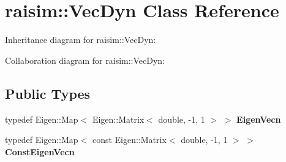 \hypertarget{classraisim_1_1VecDyn}{}\section{raisim\+:\+:Vec\+Dyn Class Reference}
\label{classraisim_1_1VecDyn}


Inheritance diagram for raisim\+:\+:Vec\+Dyn\+:


Collaboration diagram for raisim\+:\+:Vec\+Dyn\+:
\subsection*{Public Types}
\begin{DoxyCompactItemize}
\item 
\mbox{\label{classraisim_1_1VecDyn_a577d6acb0f1f3518b6cf4423c8d1a961}} 
typedef Eigen\+::\+Map$<$ Eigen\+::\+Matrix$<$ double, -\/1, 1 $>$ $>$ {\bfseries Eigen\+Vecn}
\item 
\mbox{\label{classraisim_1_1VecDyn_a14f26ed1ad1f64db87d7b107b1200344}} 
typedef Eigen\+::\+Map$<$ const Eigen\+::\+Matrix$<$ double, -\/1, 1 $>$ $>$ {\bfseries Const\+Eigen\+Vecn}
\end{DoxyCompactItemize}
